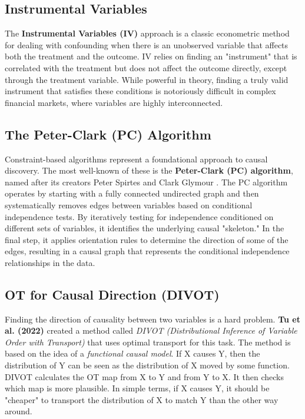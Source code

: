 \subsection*{Instrumental Variables}
The \textbf{Instrumental Variables (IV)} approach is a classic econometric method for dealing with confounding when there is an unobserved variable that affects both the treatment and the outcome. IV relies on finding an "instrument" that is correlated with the treatment but does not affect the outcome directly, except through the treatment variable. While powerful in theory, finding a truly valid instrument that satisfies these conditions is notoriously difficult in complex financial markets, where variables are highly interconnected.

\subsection*{The Peter-Clark (PC) Algorithm}
Constraint-based algorithms represent a foundational approach to causal discovery. The most well-known of these is the \textbf{Peter-Clark (PC) algorithm}, named after its creators Peter Spirtes and Clark Glymour \cite{Spirtes00}. The PC algorithm operates by starting with a fully connected undirected graph and then systematically removes edges between variables based on conditional independence tests. By iteratively testing for independence conditioned on different sets of variables, it identifies the underlying causal "skeleton." In the final step, it applies orientation rules to determine the direction of some of the edges, resulting in a causal graph that represents the conditional independence relationships in the data.

\subsection*{OT for Causal Direction (DIVOT)}
Finding the direction of causality between two variables is a hard problem. \textbf{Tu et al. (2022)} created a method called \textit{DIVOT (Distributional Inference of Variable Order with Transport)} that uses optimal transport for this task\cite{Tu22}. The method is based on the idea of a \textit{functional causal model}. If X causes Y, then the distribution of Y can be seen as the distribution of X moved by some function. DIVOT calculates the OT map from X to Y and from Y to X. It then checks which map is more plausible. In simple terms, if X causes Y, it should be "cheaper" to transport the distribution of X to match Y than the other way around.

